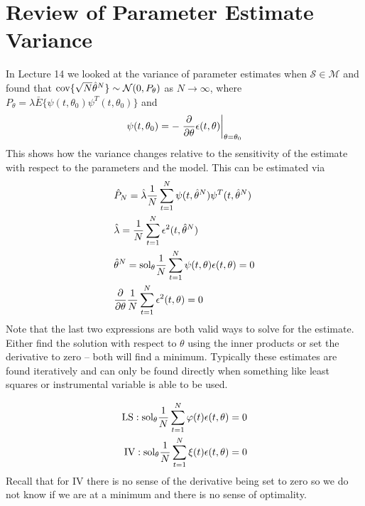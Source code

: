 
\mainmatter
\setcounter{page}{1}

\lectureseries[\course]{\course}

\date{November 17, 2009}

\setaddress

\setcounter{lecture}{14}
\setcounter{chapter}{14}


\section{Review of Parameter Estimate Variance}
In Lecture 14 we looked at the variance of parameter estimates when $\mathcal{S}\in\mathcal{M}$ and found that $\text{cov}\{\sqrt{N}\hat{\theta}^N\} \sim \mathcal{N}(0,P_\theta)$ as $N\to\infty$, where $P_\theta = \lambda\bar{E}\{\psi(t,\theta_0)\psi^T(t,\theta_0)\}$ and
$$\psi(t,\theta_0) = -\left.\frac{\partial}{\partial\theta}\epsilon(t,\theta)\right|_{\theta=\theta_0}$$
This shows how the variance changes relative to the sensitivity of the estimate with respect to the parameters and the model. This can be estimated via
\begin{align*}
&\hat{P}_N = \hat{\lambda}\frac{1}{N}\sum_{t=1}^N\psi(t,\hat{\theta}^N)\psi^T(t,\hat{\theta}^N) \\
&\hat{\lambda} = \frac{1}{N}\sum_{t=1}^N\epsilon^2(t,\hat{\theta}^N) \\
&\hat{\theta}^N = \text{sol}_\theta\frac{1}{N}\sum_{t=1}^N\psi(t,\theta)\epsilon(t,\theta) = 0 \\
&\frac{\partial}{\partial\theta}\frac{1}{N}\sum_{t=1}^N\epsilon^2(t,\theta) = 0
\end{align*}
Note that the last two expressions are both valid ways to solve for the estimate. Either find the solution with respect to $\theta$ using the inner products or set the derivative to zero -- both will find a minimum. Typically these estimates are found iteratively and can only be found directly when something like least squares or instrumental variable is able to be used.

\begin{align*}
\text{LS}: \text{sol}_\theta \frac{1}{N}\sum_{t=1}^N\varphi(t)\epsilon(t,\theta) = 0 \\
\text{IV}: \text{sol}_\theta \frac{1}{N}\sum_{t=1}^N\xi(t)\epsilon(t,\theta) = 0
\end{align*}
Recall that for IV there is no sense of the derivative being set to zero so we do not know if we are at a minimum and there is no sense of optimality.

